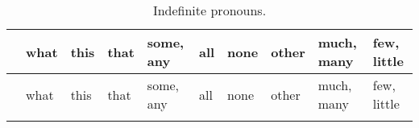 \documentclass{book}
\begin{document}
\footnotesize
{}
  \begin{longtabu} to \textwidth {l|lllllllll}
    \caption{Indefinite pronouns.} \label{table:indefinite} \\

    & what & this & that & some, any & all & none & other & much, many & few, little \\
    \hline
    \endfirsthead

    & what & this & that & some, any & all & none & other & much, many & few, little \\
    \hline
    \endhead
    
    \endfoot
    
    \endlastfoot


\end{longtabu}
\end{document}
